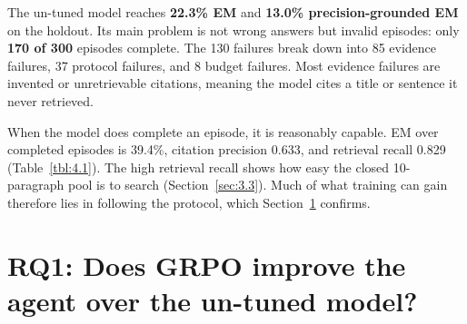 The un-tuned model reaches \textbf{22.3\% EM} and \textbf{13.0\%
precision-grounded EM} on the holdout. Its main problem is not wrong
answers but invalid episodes: only \textbf{170 of 300} episodes
complete. The 130 failures break down into 85 evidence failures, 37
protocol failures, and 8 budget failures. Most evidence failures are
invented or unretrievable citations, meaning the model cites a title or
sentence it never retrieved.

When the model does complete an episode, it is reasonably capable. EM
over completed episodes is 39.4\%, citation precision 0.633, and
retrieval recall 0.829 (Table~\ref{tbl:4.1}). The high retrieval recall
shows how easy the closed 10-paragraph pool is to search
(Section~\ref{sec:3.3}). Much of what training can gain therefore lies
in following the protocol, which Section~\ref{sec:4.3} confirms.

\section{RQ1: Does GRPO improve the agent over the un-tuned
model?}\label{sec:4.3}

